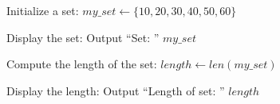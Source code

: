 \begin{algorithm}
\caption{Find the Length of a Set}
\begin{algorithmic}[1]

\STATE Initialize a set:
\STATE $my\_set \gets \{10, 20, 30, 40, 50, 60\}$

\STATE Display the set:
\STATE Output ``Set: '' $my\_set$

\STATE Compute the length of the set:
\STATE $length \gets len(my\_set)$

\STATE Display the length:
\STATE Output ``Length of set: '' $length$

\end{algorithmic}
\end{algorithm}